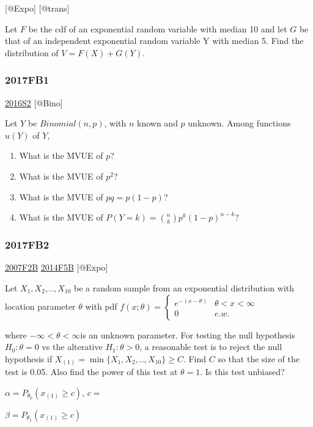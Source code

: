 \documentclass[6pt,twocolumn,Portrait]{article}
\begin{document}
{[}@Expo{]} {[}@trans{]}

Let \(F\) be the cdf of an exponential random variable with median 10
and let \(G\) be that of an independent exponential random variable Y
with median 5. Find the distribution of \(V=F(X)+G(Y)\).

\hypertarget{fb1-3}{%
\subsubsection{2017FB1}\label{fb1-3}}

\protect\hyperlink{s2-4}{2016S2} {[}@Bino{]}

Let \(Y\) be \(Binomial(n,p)\), with \(n\) known and \(p\) unknown.
Among functions \(u(Y)\) of \(Y\),

\begin{enumerate}
\def\labelenumi{(\alph{enumi})}
\item
  What is the MVUE of \(p\)?
\item
  What is the MVUE of \(p^2\)?
\item
  What is the MVUE of \(pq=p(1-p)\)?
\item
  What is the MVUE of \(P(Y=k)=\binom{n}{k}p^k(1-p)^{n-k}\)?
\end{enumerate}

\hypertarget{fb2-3}{%
\subsubsection{2017FB2}\label{fb2-3}}

\protect\hyperlink{f2b}{2007F2B} \protect\hyperlink{f5b-1}{2014F5B}
{[}@Expo{]}

Let \(X_1,X_2,..,X_{10}\) be a random sample from an exponential
distribution with location parameter \(\theta\) with pdf
\(f(x;\theta)=\begin{cases}e^{-(x-\theta)}& \theta<x<\infty\\0& e.w.\end{cases}\)

where \(-\infty<\theta<\infty\)is an unknown parameter. For testing the
null hypothesis \(H_0:\theta=0\) vs the alterative \(H_1:\theta>0\), a
reasonable test is to reject the null hypothesis if
\(X_{(1)}=\min\{X_1,X_2,..,X_{10}\}\ge C\). Find \(C\) so that the size
of the test is 0.05. Also find the power of this test at \(\theta=1\).
Is this test unbiased?

\(\alpha=P_{\theta_0}(x_{(1)}\ge c)\), \(c=\)

\(\beta=P_{\theta_1}(x_{(1)}\ge c)\)
\end{document}
